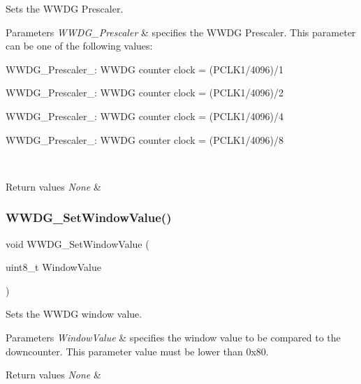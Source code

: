 Sets the W\+W\+DG Prescaler. 


\begin{DoxyParams}{Parameters}
{\em W\+W\+D\+G\+\_\+\+Prescaler} & specifies the W\+W\+DG Prescaler. This parameter can be one of the following values\+: \begin{DoxyItemize}
\item W\+W\+D\+G\+\_\+\+Prescaler\+\_\+: W\+W\+DG counter clock = (P\+C\+L\+K1/4096)/1 \item W\+W\+D\+G\+\_\+\+Prescaler\+\_\+: W\+W\+DG counter clock = (P\+C\+L\+K1/4096)/2 \item W\+W\+D\+G\+\_\+\+Prescaler\+\_\+: W\+W\+DG counter clock = (P\+C\+L\+K1/4096)/4 \item W\+W\+D\+G\+\_\+\+Prescaler\+\_\+: W\+W\+DG counter clock = (P\+C\+L\+K1/4096)/8 \end{DoxyItemize}
\\
\hline
\end{DoxyParams}

\begin{DoxyRetVals}{Return values}
{\em None} & \\
\hline
\end{DoxyRetVals}
\mbox{\label{group___w_w_d_g___exported___functions_gaf44a7bf8bf6b11b41cd89ff521fdd5a5}} 
\subsubsection{\texorpdfstring{WWDG\_SetWindowValue()}{WWDG\_SetWindowValue()}}
{\footnotesize\ttfamily void W\+W\+D\+G\+\_\+\+Set\+Window\+Value (\begin{DoxyParamCaption}\item[{uint8\+\_\+t}]{Window\+Value }\end{DoxyParamCaption})}



Sets the W\+W\+DG window value. 


\begin{DoxyParams}{Parameters}
{\em Window\+Value} & specifies the window value to be compared to the downcounter. This parameter value must be lower than 0x80. \\
\hline
\end{DoxyParams}

\begin{DoxyRetVals}{Return values}
{\em None} & \\
\hline
\end{DoxyRetVals}
